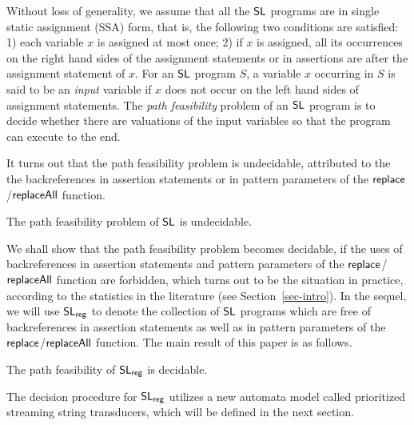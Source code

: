 Without loss of generality, we assume that all the $\mathsf{SL}$ programs are in single static assignment (SSA) form, that is, the following two conditions are satisfied: 1) each variable $x$ is assigned at most once; 2) if $x$ is assigned, all its occurrences on the right hand sides of the assignment statements or in assertions are after the assignment statement of $x$.
%
For an $\mathsf{SL}$ program $S$, a variable $x$ occurring in $S$ is said to be an \emph{input} variable if $x$ does not occur on the left hand sides of assignment statements. The \emph{path feasibility} problem of an $\mathsf{SL}$ program is to decide whether there are valuations of the input variables so that the program can execute to the end.


%





It turns out that the path feasibility problem is undecidable, attributed to the the backreferences in assertion statements or in pattern parameters of the $\mathsf{replace}$/$\mathsf{replaceAll}$ function. 

\begin{proposition}\label{prop-und}
The path feasibility problem of $\mathsf{SL}$ is undecidable.
\end{proposition}

We shall show that the path feasibility problem becomes decidable, if the uses of backreferences in assertion statements and pattern parameters of the $\mathsf{replace}$/$\mathsf{replaceAll}$ function are forbidden, which turns out to be the situation in practice,  according to the statistics in the literature (see Section~\ref{sec-intro}).
In the sequel, we will use $\mathsf{SL}_{\sf reg}$ to denote the collection of $\mathsf{SL}$ programs which are free of %
backreferences in assertion statements as well as in pattern parameters of the $\mathsf{replace}$/$\mathsf{replaceAll}$ function. %
The main result of this paper is as follows.

\begin{theorem}\label{thm-main}
The path feasibility of $\mathsf{SL}_{\sf reg}$ is decidable.
\end{theorem}
The decision procedure for $\mathsf{SL}_{\sf reg}$ utilizes a new automata model called prioritized streaming string transducers, which will be defined in the next section.
